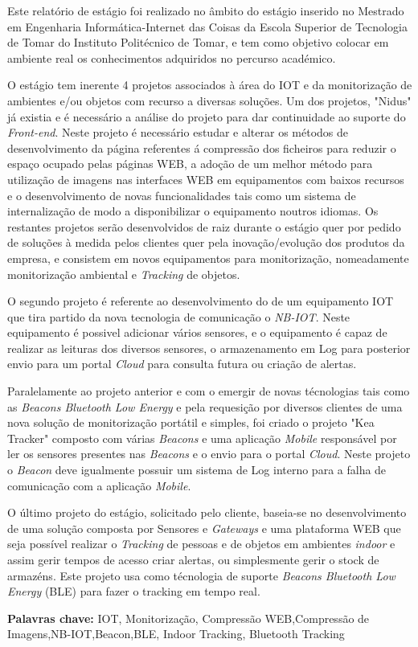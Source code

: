 
\vspace{1cm}
\noindent
\par Este relatório de estágio foi realizado no âmbito do estágio inserido no Mestrado em Engenharia Informática-Internet das Coisas da Escola Superior de Tecnologia de Tomar do Instituto Politécnico de Tomar, e tem como objetivo colocar em ambiente real os conhecimentos adquiridos no percurso académico.
\par
O estágio tem inerente 4 projetos associados à área do IOT e da monitorização de ambientes e/ou objetos com recurso a diversas soluções. Um dos projetos, "Nidus" já existia e é necessário a análise do projeto para dar continuidade ao suporte do \textit{Front-end}. Neste projeto é necessário estudar e alterar os métodos de desenvolvimento da página referentes á compressão dos ficheiros para reduzir o espaço ocupado pelas páginas WEB, a adoção de um melhor método para utilização de imagens nas interfaces WEB em equipamentos com baixos recursos e o desenvolvimento de novas funcionalidades tais como um sistema de internalização de modo a disponibilizar o equipamento noutros idiomas. Os restantes projetos serão desenvolvidos de raiz durante o estágio quer por pedido de soluções à medida pelos clientes quer pela inovação/evolução dos produtos da empresa, e consistem em novos equipamentos para monitorização, nomeadamente monitorização ambiental e \textit{Tracking} de objetos.
\par O segundo projeto é referente ao desenvolvimento do de um equipamento IOT que tira partido da nova tecnologia de comunicação o \textit{NB-IOT}. Neste equipamento é possivel adicionar vários sensores, e o equipamento é capaz de realizar as leituras dos diversos sensores, o armazenamento em Log para posterior envio para um portal \textit{Cloud} para consulta futura ou criação de alertas.
\par Paralelamente ao projeto anterior e com o emergir de novas técnologias tais como as \textit{Beacons Bluetooth Low Energy} e pela requesição por diversos clientes de uma nova solução de monitorização portátil e simples, foi criado o projeto "Kea Tracker" composto com várias \textit{Beacons} e uma aplicação \textit{Mobile} responsável por ler os sensores presentes nas \textit{Beacons} e o envio para o portal \textit{Cloud}. Neste projeto o \textit{Beacon} deve igualmente possuir um sistema de Log interno para a falha de comunicação com a aplicação \textit{Mobile}.
\par O último projeto do estágio, solicitado pelo cliente, baseia-se no desenvolvimento de uma solução composta por Sensores e \textit{Gateways} e uma plataforma WEB que seja possível realizar o \textit{Tracking} de pessoas e de objetos em ambientes \textit{indoor} e assim gerir tempos de acesso criar alertas, ou simplesmente gerir o stock de armazéns. Este projeto usa como técnologia de suporte \textit{Beacons Bluetooth Low Energy} (BLE) para fazer o tracking em tempo real.




\bigskip

\textbf{Palavras chave:}
IOT, Monitorização, Compressão WEB,Compressão de Imagens,NB-IOT,Beacon,BLE, Indoor Tracking, Bluetooth Tracking
